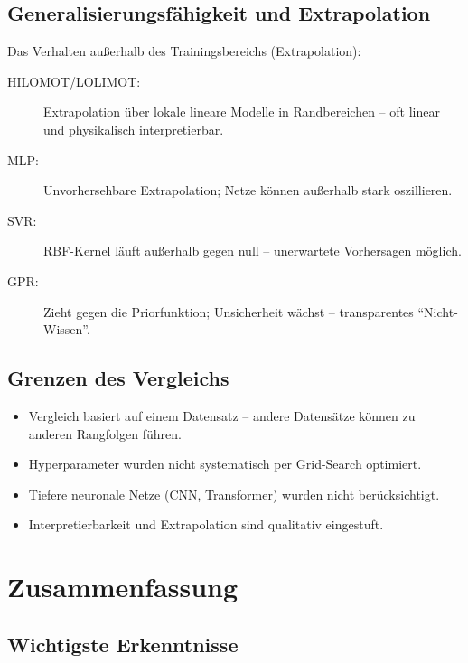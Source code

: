\documentclass[11pt,a4paper]{report}
\begin{document}
\section{Generalisierungsf\"{a}higkeit und Extrapolation}

Das Verhalten au\ss{}erhalb des Trainingsbereichs (Extrapolation):

\begin{description}
\item[HILOMOT/LOLIMOT:] Extrapolation \"{u}ber lokale lineare Modelle in Randbereichen -- oft
    linear und physikalisch interpretierbar.
\item[MLP:] Unvorhersehbare Extrapolation; Netze k\"{o}nnen au\ss{}erhalb stark oszillieren.
\item[SVR:] RBF-Kernel l\"{a}uft au\ss{}erhalb gegen null -- unerwartete Vorhersagen m\"{o}glich.
\item[GPR:] Zieht gegen die Priorfunktion; Unsicherheit w\"{a}chst -- transparentes
    ``Nicht-Wissen''.
\end{description}

\section{Grenzen des Vergleichs}

\begin{itemize}
\item Vergleich basiert auf einem Datensatz -- andere Datens\"{a}tze k\"{o}nnen zu anderen
      Rangfolgen f\"{u}hren.
\item Hyperparameter wurden nicht systematisch per Grid-Search optimiert.
\item Tiefere neuronale Netze (CNN, Transformer) wurden nicht ber\"{u}cksichtigt.
\item Interpretierbarkeit und Extrapolation sind qualitativ eingestuft.
\end{itemize}

\chapter{Zusammenfassung}

\section{Wichtigste Erkenntnisse}
\end{document}
